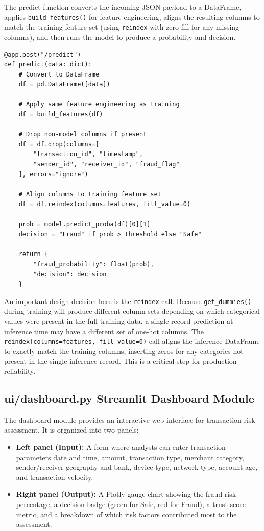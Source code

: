 The predict function converts the incoming JSON payload to a DataFrame, applies \texttt{build\_features()} for feature engineering, aligns the resulting columns to match the training feature set (using \texttt{reindex} with zero-fill for any missing columns), and then runs the model to produce a probability and decision.

\begin{lstlisting}[caption={FastAPI predict endpoint implementation}, label={lst:api}]
@app.post("/predict")
def predict(data: dict):
    # Convert to DataFrame
    df = pd.DataFrame([data])

    # Apply same feature engineering as training
    df = build_features(df)

    # Drop non-model columns if present
    df = df.drop(columns=[
        "transaction_id", "timestamp",
        "sender_id", "receiver_id", "fraud_flag"
    ], errors="ignore")

    # Align columns to training feature set
    df = df.reindex(columns=features, fill_value=0)

    prob = model.predict_proba(df)[0][1]
    decision = "Fraud" if prob > threshold else "Safe"

    return {
        "fraud_probability": float(prob),
        "decision": decision
    }
\end{lstlisting}

An important design decision here is the \texttt{reindex} call. Because \texttt{get\_dummies()} during training will produce different column sets depending on which categorical values were present in the full training data, a single-record prediction at inference time may have a different set of one-hot columns. The \texttt{reindex(columns=features, fill\_value=0)} call aligns the inference DataFrame to exactly match the training columns, inserting zeros for any categories not present in the single inference record. This is a critical step for production reliability.

\subsection{ui/dashboard.py Streamlit Dashboard Module}

The dashboard module provides an interactive web interface for transaction risk assessment. It is organized into two panels:

\begin{itemize}
    \item \textbf{Left panel (Input):} A form where analysts can enter transaction parameters date and time, amount, transaction type, merchant category, sender/receiver geography and bank, device type, network type, account age, and transaction velocity.
    \item \textbf{Right panel (Output):} A Plotly gauge chart showing the fraud risk percentage, a decision badge (green for Safe, red for Fraud), a trust score metric, and a breakdown of which risk factors contributed most to the assessment.
\end{itemize}

